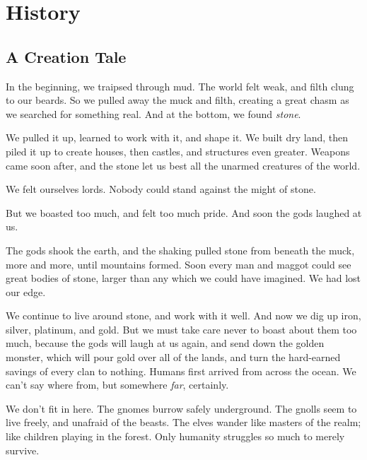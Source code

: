 \section{History}

\begin{multicols}{2}

\subsection{A Creation Tale}

\begin{exampletext}

\ifcase\value{r4}\relax\or
  \noindent
  In the beginning, we traipsed through mud.
  The world felt weak, and filth clung to our beards.
  So we pulled away the muck and filth, creating a great chasm as we searched for something real.
  And at the bottom, we found \emph{stone}.

  We pulled it up, learned to work with it, and shape it.
  We built dry land, then piled it up to create houses, then castles, and structures even greater.
  Weapons came soon after, and the stone let us best all the unarmed creatures of the world.

  We felt ourselves lords.
  Nobody could stand against the might of stone.

  But we boasted too much, and felt too much pride.
  And soon the gods laughed at us.

  The gods shook the earth, and the shaking pulled stone from beneath the muck, more and more, until mountains formed.
  Soon every man and maggot could see great bodies of stone, larger than any which we could have imagined.
  We had lost our edge.

  We continue to live around stone, and work with it well.
  And now we dig up iron, silver, platinum, and gold.
  But we must take care never to boast about them too much, because the gods will laugh at us again, and send down the golden monster, which will pour gold over all of the lands, and turn the hard-earned savings of every clan to nothing.
\or
  Humans first arrived from across the ocean.
  We can't say where from, but somewhere \emph{far}, certainly.

  We don't fit in here.
  The gnomes burrow safely underground.
  The gnolls seem to live freely, and unafraid of the beasts.
  The elves wander like masters of the realm; like children playing in the forest.
  Only humanity struggles so much to merely survive.


\end{exampletext}
\end{multicols}
